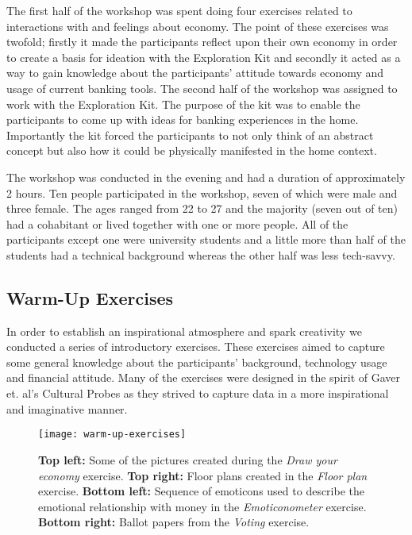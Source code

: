 The first half of the workshop was spent doing four exercises related to interactions with and feelings about economy. The point of these exercises was twofold; firstly it made the participants reflect upon their own economy in order to create a basis for ideation with the Exploration Kit and secondly it acted as a way to gain knowledge about the participants’ attitude towards economy and usage of current banking tools. The second half of the workshop was assigned to work with the Exploration Kit. The purpose of the kit was to enable the participants to come up with ideas for banking experiences in the home. Importantly the kit forced the participants to not only think of an abstract concept but also how it could be physically manifested in the home context.

The workshop was conducted in the evening and had a duration of approximately 2 hours. Ten people participated in the workshop, seven of which were male and three female. The ages ranged from 22 to 27 and the majority (seven out of ten) had a cohabitant or lived together with one or more people. All of the participants except one were university students and a little more than half of the students had a technical background whereas the other half was less tech-savvy.

\subsection{Warm-Up Exercises}
In order to establish an inspirational atmosphere and spark creativity we conducted a series of introductory exercises. These exercises aimed to capture some general knowledge about the participants’ background, technology usage and financial attitude. Many of the exercises were designed in the spirit of Gaver et. al’s Cultural Probes \cite{gaver1999design} as they strived to capture data in a more inspirational and imaginative manner.

\begin{figure}[!h]
	\centering
	\texttt{[image: warm-up-exercises]}
	\caption{\textbf{Top left:} Some of the pictures created during the \textit{Draw your economy} exercise. \textbf{Top right:} Floor plans created in the \textit{Floor plan} exercise. \textbf{Bottom left:} Sequence of emoticons used to describe the emotional relationship with money in the \textit{Emoticonometer} exercise. \textbf{Bottom right:} Ballot papers from the \textit{Voting} exercise.}
	\label{fig:warm-up-exercises}
\end{figure}

